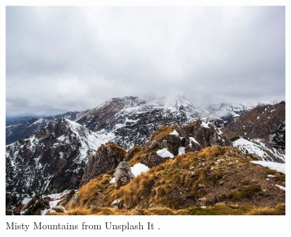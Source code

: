 \begin{figure}[h]
\centering
\includegraphics[width=\linewidth,natwidth=400,natheight=300]{../figures/mountains.jpg}
\caption{Misty Mountains from Unsplash It \cite{unsplash}.}
\label{fig:mountains}
\end{figure}
